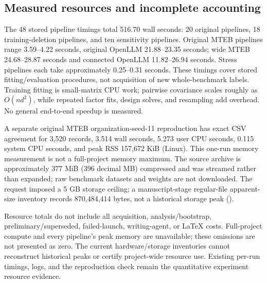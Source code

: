 \documentclass{article}
\DeclareRobustCommand{\artifact}[1]{\path{#1}}
\begin{document}
\subsection{Measured resources and incomplete accounting}\label{app:resources}
The 48 stored pipeline timings total 516.70 wall seconds: 20 original pipelines, 18 training-deletion pipelines, and ten sensitivity pipelines. Original MTEB pipelines range 3.59--4.22 seconds, original OpenLLM 21.88--23.35 seconds; wide MTEB 24.68--28.87 seconds and connected OpenLLM 11.82--26.94 seconds. Stress pipelines each take approximately 0.25--0.31 seconds. These timings cover stored fitting/evaluation procedures, not acquisition of new whole-benchmark labels. Training fitting is small-matrix CPU work; pairwise covariance scales roughly as $O(nd^2)$, while repeated factor fits, design solves, and resampling add overhead. No general end-to-end speedup is measured.

A separate original MTEB organization-seed-11 reproduction has exact CSV agreement for 3,520 records, 3.514 wall seconds, 5.273 user CPU seconds, 0.115 system CPU seconds, and peak RSS 157,672 KiB (Linux). This one-run memory measurement is not a full-project memory maximum. The source archive is approximately 377 MiB (396 decimal MB) compressed and was streamed rather than expanded; raw benchmark datasets and weights are not downloaded. The request imposed a 5 GB storage ceiling; a manuscript-stage regular-file apparent-size inventory records 870,484,414 bytes, not a historical storage peak (\artifact{paper/storage.txt}).

Resource totals do not include all acquisition, analysis/bootstrap, preliminary/superseded, failed-launch, writing-agent, or LaTeX costs. Full-project compute and every pipeline's peak memory are unavailable; these omissions are not presented as zero. The current hardware/storage inventories cannot reconstruct historical peaks or certify project-wide resource use. Existing per-run timings, logs, and the reproduction check remain the quantitative experiment resource evidence.
\end{document}
